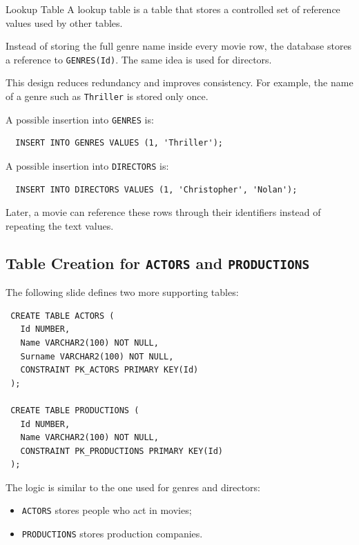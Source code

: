  \begin{defbox}{Lookup Table}
  A lookup table is a table that stores a controlled set of reference values used by other tables.
 \end{defbox}

 Instead of storing the full genre name inside every movie row, the database stores a reference to \texttt{GENRES(Id)}. The same idea is used for directors.

 This design reduces redundancy and improves consistency. For example, the name of a genre such as \texttt{Thriller} is stored only once.

 \begin{example}
  A possible insertion into \texttt{GENRES} is:
  \begin{verbatim}
  INSERT INTO GENRES VALUES (1, 'Thriller');
  \end{verbatim}
  \vspace{-0.4cm}

  A possible insertion into \texttt{DIRECTORS} is:
  \begin{verbatim}
  INSERT INTO DIRECTORS VALUES (1, 'Christopher', 'Nolan');
  \end{verbatim}
  \vspace{-0.4cm}

  Later, a movie can reference these rows through their identifiers instead of repeating the text values.
 \end{example}

 \subsection{Table Creation for \texttt{ACTORS} and \texttt{PRODUCTIONS}}

 The following slide defines two more supporting tables:

 \begin{verbatim}
 CREATE TABLE ACTORS (
   Id NUMBER,
   Name VARCHAR2(100) NOT NULL,
   Surname VARCHAR2(100) NOT NULL,
   CONSTRAINT PK_ACTORS PRIMARY KEY(Id)
 );

 CREATE TABLE PRODUCTIONS (
   Id NUMBER,
   Name VARCHAR2(100) NOT NULL,
   CONSTRAINT PK_PRODUCTIONS PRIMARY KEY(Id)
 );
 \end{verbatim}
 \vspace{-0.4cm}

 The logic is similar to the one used for genres and directors:
 \begin{itemize}
  \item \texttt{ACTORS} stores people who act in movies;
  \item \texttt{PRODUCTIONS} stores production companies.
 \end{itemize}

